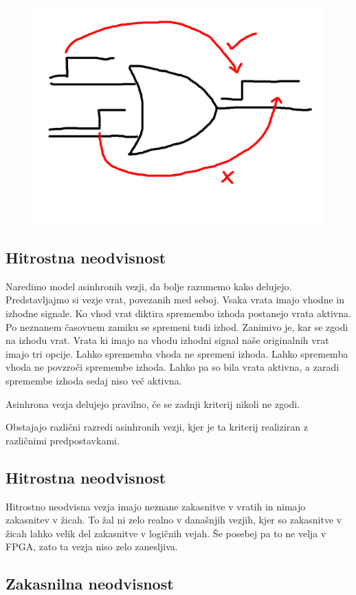\begin{figure}[H]
	\centering
	\includegraphics[width=0.7\linewidth]{slike/osnove/indication}
	\caption{}
	\label{fig:celement}
\end{figure}




\subsection{Hitrostna neodvisnost} \label{b}
Naredimo model asinhronih vezji, da bolje razumemo kako delujejo. Predstavljajmo si vezje vrat, povezanih med seboj. Vsaka vrata imajo vhodne in izhodne signale. Ko vhod vrat diktira spremembo izhoda postanejo vrata aktivna. Po neznanem časovnem zamiku se spremeni tudi izhod. Zanimivo je, kar se zgodi na izhodu vrat. Vrata ki imajo na vhodu izhodni signal naše originalnih vrat imajo tri opcije.
Lahko sprememba vhoda ne spremeni izhoda.
Lahko sprememba vhoda ne povzroči spremembe izhoda.
Lahko pa so bila vrata aktivna, a zaradi spremembe izhoda sedaj niso več aktivna.

Asinhrona vezja delujejo pravilno, če se zadnji kriterij nikoli ne zgodi.

Obstajajo različni razredi asinhronih vezji, kjer je ta kriterij realiziran z različnimi predpostavkami.

\subsection{Hitrostna neodvisnost} \label{b}
Hitrostno neodvisna vezja imajo neznane zakasnitve v vratih in nimajo zakasnitev v žicah. To žal ni zelo realno v današnjih vezjih, kjer so zakasnitve v žicah lahko velik del zakasnitve v logičnih vejah. Še posebej pa to ne velja v FPGA, zato ta vezja niso zelo zanesljiva.

\subsection{Zakasnilna neodvisnost} \label{b}

